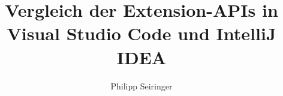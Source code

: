 \documentclass[bachelor,german,smartquotes]{hgbthesis}
\begin{document}


\title{Vergleich der Extension-APIs in Visual Studio Code und IntelliJ IDEA}
\author{Philipp Seiringer}





\frontmatter                                       %

\maketitle
\tableofcontents

		
			

\mainmatter                             %










\appendix                                                               %


\backmatter                          %

\MakeBibliography %




\end{document}
